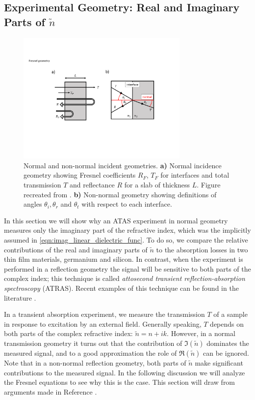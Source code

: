 \subsection{Experimental Geometry: Real and Imaginary Parts of $\tilde{n}$}
\label{sec:real_imag_index}

\begin{figure}
	\centering
	\includegraphics[width=0.75\textwidth]{figures/chap1/Fresnel_Geometry.pdf}
	\caption{Normal and non-normal incident geometries. \textbf{a)} Normal incidence geometry showing Fresnel coefficients $R_F$, $T_F$ for interfaces and total transmission $T$ and reflectance $R$ for a slab of thickness $L$. Figure recreated from \cite{nichelattiComplexRefractiveIndex2002}. \textbf{b)} Non-normal geometry showing definitions of angles $\theta_i, \theta_r$ and $\theta_t$ with respect to each interface.}
	\label{fig:Fresnel_Geometry}
\end{figure}

In this section we will show why an ATAS experiment in normal geometry measures only the imaginary part of the refractive index, which was the implicitly assumed in \cref{eqn:imag_linear_dielectric_func}. To do so, we compare the relative contributions of the real and imaginary parts of $\tilde{n}$ to the absorption losses in two thin film materials, germanium and silicon. In contrast, when the experiment is performed in a reflection geometry the signal will be sensitive to both parts of the complex index; this technique is called \textit{attosecond transient reflection-absorption spectroscopy} (ATRAS). Recent examples of this technique can be found in the literature \cite{cirriAchievingSurfaceSensitivity2017,kaplanFemtosecondTrackingCarrier2018}.

In a transient absorption experiment, we measure the transmission $T$ of a sample in response to excitation by an external field. Generally speaking, $T$ depends on both parts of the complex refractive index: $\tilde{n} = n + i k$. However, in a normal transmission geometry it turns out that the contribution of $\Im(\tilde{n})$ dominates the measured signal, and to a good approximation the role of $\Re(\tilde{n})$ can be ignored. Note that in a non-normal reflection geometry, both parts of $\tilde{n}$ make significant contributions to the measured signal. In the following discussion we will analyze the Fresnel equations to see why this is the case. This section will draw from arguments made in Reference \cite{nichelattiComplexRefractiveIndex2002}.

